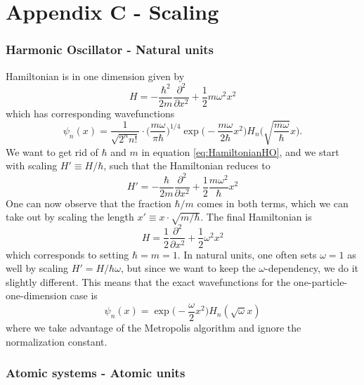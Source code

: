 \chapter{Appendix C - Scaling}

\subsection{Harmonic Oscillator - Natural units}
Hamiltonian is in one dimension given by
\begin{equation}
H=-\frac{\hbar^2}{2m}\frac{\partial^2}{\partial x^2}+\frac{1}{2}m\omega^2x^2
\label{eq:HamiltonianHO}
\end{equation}
which has corresponding wavefunctions
\begin{equation}
\psi_n(x)=\frac{1}{\sqrt{2^nn!}}\cdot\bigg(\frac{m\omega}{\pi\hbar}\bigg)^{1/4}\exp\Big(-\frac{m\omega}{2\hbar}x^2\Big)H_n\Big(\sqrt{\frac{m\omega}{\hbar}}x\Big).
\end{equation}
We want to get rid of $\hbar$ and $m$ in equation \eqref{eq:HamiltonianHO}, and we start with scaling $H'\equiv H/\hbar$, such that the Hamiltonian reduces to
\begin{equation}
H'=-\frac{\hbar}{2m}\frac{\partial^2}{\partial x^2}+\frac{1}{2}\frac{m\omega^2}{\hbar}x^2
\end{equation}
One can now observe that the fraction $\hbar/m$ comes in both terms, which we can take out by scaling the length $x'\equiv x\cdot\sqrt{m/\hbar}$. The final Hamiltonian is
\begin{equation}
H=\frac{1}{2}\frac{\partial^2}{\partial x^2}+\frac{1}{2}\omega^2x^2
\end{equation}
which corresponds to setting $\hbar=m=1$. In natural units, one often sets $\omega=1$ as well by scaling $H'=H/\hbar\omega$, but since we want to keep the $\omega$-dependency, we do it slightly different. This means that the exact wavefunctions for the one-particle-one-dimension case is
\begin{equation}
\psi_n(x)=\exp\Big(-\frac{\omega}{2}x^2\Big)H_n(\sqrt{\omega}x)
\end{equation}
where we take advantage of the Metropolis algorithm and ignore the normalization constant. 

\subsection{Atomic systems - Atomic units}
